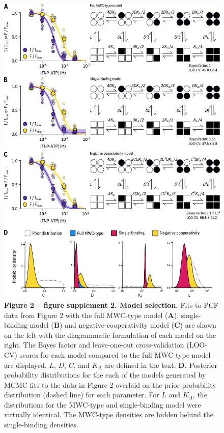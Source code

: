 \documentclass[10pt,lineno, doublespacing]{elife_modified}
\begin{document}
\begin{figure}
\begin{fullwidth}
\centering
\includegraphics[height=0.75\textheight]{figure_two_s2}
\captionsetup{labelformat=empty}
\caption{
\textbf{Figure 2 -- figure supplement 2. Model selection.}
Fits to PCF data from Figure 2 with the full MWC-type model (\textbf{A}), single-binding model (\textbf{B}) and negative-cooperativity model (\textbf{C}) are shown on the left with the diagrammatic formulation of each model on the right.
The Bayes factor and leave-one-out cross-validation (LOO-CV) scores for each model compared to the full MWC-type model are displayed.
$L$, $D$, $C$, and $K_A$ are defined in the text.
\textbf{D.}
Posterior probability distributions for the each of the models generated by MCMC fits to the data in Figure 2 overlaid on the prior probability distribution (dashed line) for each parameter.
For $L$ and $K_A$, the distributions for the MWC-type and single-binding model were virtually identical.
The MWC-type densities are hidden behind the single-binding densities.
}
\label{fig:two_s2}
\end{fullwidth}
\end{figure}
\end{document}
